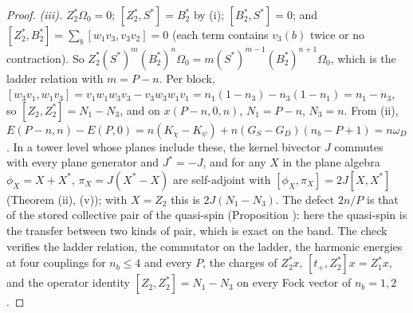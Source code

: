 \begin{proof}
\emph{(iii).} $Z_{2}^{*}\Omega_{0} = 0$; $[Z_{2}^{*}, S^{*}] = B_{2}^{*}$ by (i); $[B_{2}^{*}, S^{*}] = 0$; and $[Z_{2}^{*}, B_{2}^{*}] = \sum_{b}[w_{1}v_{3}, v_{3}v_{2}] = 0$ (each term contains $v_{3}(b)$ twice or no contraction). So $Z_{2}^{*}(S^{*})^{m}(B_{2}^{*})^{n}\Omega_{0} = m(S^{*})^{m - 1}(B_{2}^{*})^{n + 1}\Omega_{0}$, which is the ladder relation with $m = P - n$. Per block, $[w_{3}v_{1}, w_{1}v_{3}] = v_{1}w_{1}w_{3}v_{3} - v_{3}w_{3}w_{1}v_{1} = n_{1}(1 - n_{3}) - n_{3}(1 - n_{1}) = n_{1} - n_{3}$, so $[Z_{2}, Z_{2}^{*}] = N_{1} - N_{3}$, and on $x(P - n, 0, n)$, $N_{1} = P - n$, $N_{3} = n$. From (ii), $E(P - n, n) - E(P, 0) = n(K_{\chi} - K_{\psi}) + n(G_{S} - G_{D})(n_{b} - P + 1) = n\omega_{D}$. In a tower level whose planes include these, the kernel bivector $J$ commutes with every plane generator and $J^{*} = -J$, and for any $X$ in the plane algebra $\phi_{X} = X + X^{*}$, $\pi_{X} = J(X^{*} - X)$ are self-adjoint with $[\phi_{X}, \pi_{X}] = 2J[X, X^{*}]$ (Theorem (ii), (v)); with $X = Z_{2}$ this is $2J(N_{1} - N_{3})$. The defect $2n/P$ is that of the stored collective pair of the quasi-spin (Proposition ): here the quasi-spin is the transfer between two kinds of pair, which is exact on the band. The check verifies the ladder relation, the commutator on the ladder, the harmonic energies at four couplings for $n_{b} \le 4$ and every $P$, the charges of $Z_{2}^{*}x$, $[t_{+}, Z_{2}^{*}]x = Z_{1}^{*}x$, and the operator identity $[Z_{2}, Z_{2}^{*}] = N_{1} - N_{3}$ on every Fock vector of $n_{b} = 1, 2$.


\end{proof}

